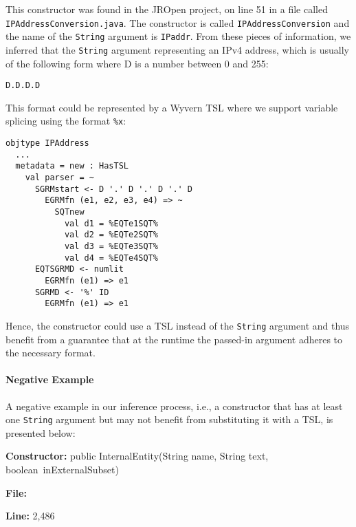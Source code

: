 \vspace{10px}


This constructor was found in the JROpen project, on line 51 in a file called \mbox{\lstinline{IPAddressConversion.java}}. The constructor is called \lstinline{IPAddressConversion} and the name of the \lstinline{String} argument is \lstinline{IPaddr}. From these pieces of information, we inferred that the \lstinline{String} argument representing an IPv4 address, which is usually of the following form where D is a number between 0 and 255:

\begin{lstlisting}[numbers=none]
D.D.D.D
\end{lstlisting}

This format could be represented by a Wyvern TSL where we support variable splicing using the format \lstinline{%x}:

\begin{lstlisting}
objtype IPAddress
  ...
  metadata = new : HasTSL
    val parser = ~
      SGRMstart <- D '.' D '.' D '.' D
        EGRMfn (e1, e2, e3, e4) => ~
          SQTnew
            val d1 = %EQTe1SQT%
            val d2 = %EQTe2SQT%
            val d3 = %EQTe3SQT%
            val d4 = %EQTe4SQT%
      EQTSGRMD <- numlit
        EGRMfn (e1) => e1
      SGRMD <- '%' ID
        EGRMfn (e1) => e1
\end{lstlisting}

Hence, the constructor could use a TSL instead of the \lstinline{String} argument and thus benefit from a guarantee that at the runtime the passed-in argument adheres to the necessary format.


\paragraph{Negative Example} A negative example in our inference process, i.e., a constructor that has at least one \lstinline{String} argument but may not benefit from substituting it with a TSL, is presented below:

\vspace{10px}

\begin{small}

\noindent \textbf{Constructor:} public InternalEntity(String name, String text, \mbox{boolean inExternalSubset})

\noindent \textbf{File:} 

\noindent \textbf{Line:} 2,486

\end{small}


